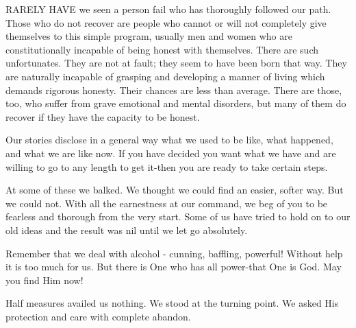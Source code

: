 
\bbChapterPreamble

\begin{biblechapter}
    RARELY HAVE we seen a person fail who has thoroughly followed our path.
\verse Those who do not recover 
    are people who cannot or will not 
    completely give themselves to this simple program, 
    usually men and women 
    who are constitutionally incapable of being honest with themselves.
\verse There are such unfortunates.
\verse They are not at fault; 
    they seem to have been born that way.
\verse They are naturally incapable of grasping and developing 
    a manner of living which demands rigorous honesty.
\verse Their chances are less than average.
\verse There are those, too, 
    who suffer from grave emotional and mental disorders, 
    but many of them do recover if they have the capacity to be honest.

    Our stories disclose in a general way 
    what we used to be like, 
    what happened, 
    and what we are like now.
\verse If you have decided you want what we have 
    and are willing to go to any length to get it-then 
    you are ready to take certain steps.

    At some of these we balked.
\verse We thought we could find an easier, softer way.
\verse But we could not.
\verse With all the earnestness at our command, 
    we beg of you to be fearless and thorough from the very start.
\verse Some of us have tried to hold on to our old ideas 
    and the result was nil until we let go absolutely.

    Remember that we deal with alcohol - cunning, baffling, powerful!
\verse Without help it is too much for us.
\verse But there is One who has all power-that One is God.
\verse May you find Him now!

    Half measures availed us nothing.
\verse We stood at the turning point.
\verse We asked His protection and care with complete abandon.
\end{biblechapter}


